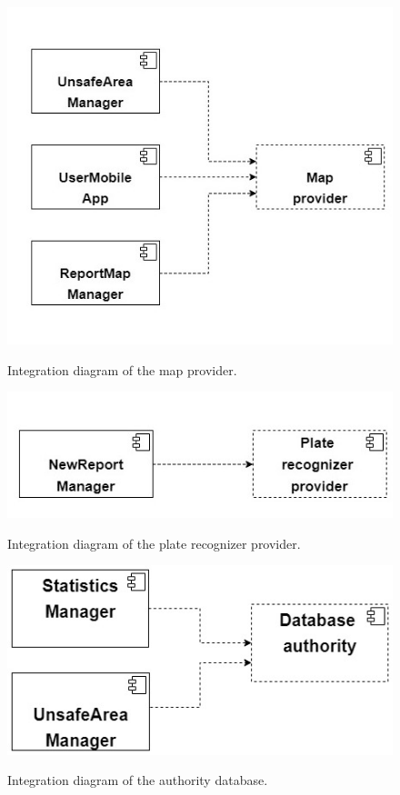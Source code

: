 \documentclass[../RASD.tex]{subfiles}
\begin{document}
    \begin{figure}[H]
        \centering
        \includegraphics[scale = 0.8]{assets/integration_diagrams/map_provider_integration.png}\\
        \caption[\textit{Integration} Diagram of the map provider]{Integration diagram of the map provider.}
    \end{figure}

    \begin{figure}[H]
        \centering
        \includegraphics[scale = 0.8]{assets/integration_diagrams/plate_provider_integration.png}\\
        \caption[\textit{Integration} Diagram of the plate recognizer provider]{Integration diagram of the plate recognizer provider.}
    \end{figure}

    \begin{figure}[H]
        \centering
        \includegraphics[scale = 0.6]{assets/integration_diagrams/db_authority_integration.png}\\
        \caption[\textit{Integration} Diagram of the authority database]{Integration diagram of the authority database.}
    \end{figure}
\end{document}
